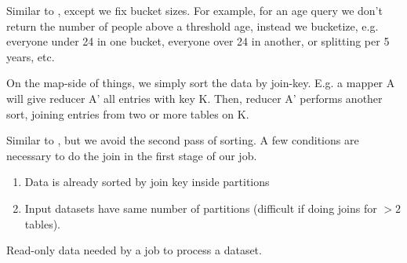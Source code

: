 \begin{definition}
    Similar to , except we fix bucket sizes.
    For example, for an age query we don't return the number of people above a threshold age,
    instead we bucketize, e.g. everyone under 24 in one bucket, everyone over 24 in another,
    or splitting per 5 years, etc.
\end{definition}


\begin{definition}\label{def:reducejoin}
    On the map-side of things, we simply sort the data by join-key. E.g. a mapper A
    will give reducer A' all entries with key K. Then, reducer A' performs another sort,
    joining entries from two or more tables on K.
\end{definition}


\begin{definition}\label{def:mapjoin}
    Similar to , but we avoid the second pass of sorting.
    A few conditions are necessary to do the join in the first stage of our job.
    \begin{enumerate}
        \item Data is already sorted by join key inside partitions
        \item Input datasets have same number of partitions (difficult if doing joins 
            for $> 2$ tables).
    \end{enumerate}
\end{definition}

\begin{definition}\label{def:sidedata}
    Read-only data needed by a job to process a dataset.
\end{definition}

